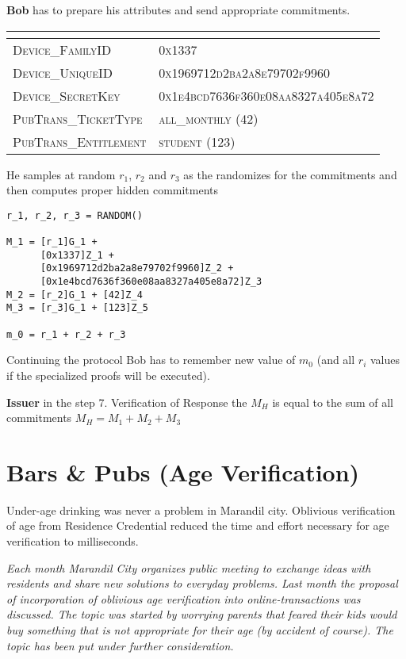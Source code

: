 \textbf{Bob} has to prepare his attributes and send appropriate commitments.
\begin{table}[H]
\centering
\renewcommand{\arraystretch}{1.3}
\begin{tabular}{>{\ttfamily\scshape}l >{\ttfamily\scshape}l}
\hline
\multicolumn{1}{c}{\textbf{UID}} & \multicolumn{1}{c}{\textbf{Value}} \\ \hline
Device\_FamilyID & 0x1337  \\
Device\_UniqueID & 0x1969712d2ba2a8e79702f9960  \\
Device\_SecretKey & 0x1e4bcd7636f360e08aa8327a405e8a72  \\
PubTrans\_TicketType & all\_monthly (42)  \\
PubTrans\_Entitlement & student (123) \\\hline
\end{tabular}
\end{table}

He samples at random $r_1$, $r_2$ and $r_3$ as the randomizes for the commitments and then computes proper \textsf{hidden} commitments

\small
\begin{verbatim}
r_1, r_2, r_3 = RANDOM()

M_1 = [r_1]G_1 + 
      [0x1337]Z_1 +
      [0x1969712d2ba2a8e79702f9960]Z_2 + 
      [0x1e4bcd7636f360e08aa8327a405e8a72]Z_3
M_2 = [r_2]G_1 + [42]Z_4
M_3 = [r_3]G_1 + [123]Z_5

m_0 = r_1 + r_2 + r_3
\end{verbatim}
\normalsize

Continuing the protocol Bob has to remember new value of $m_0$ (and all $r_i$ values if the specialized proofs will be executed).


\noindent\textbf{Issuer}  in the step 7. Verification of Response the $M_H$ is equal to the sum of all commitments $M_H = M_1 + M_2 + M_3$ 


\section{Bars \& Pubs (Age Verification)}

Under-age drinking was never a problem in Marandil city. Oblivious verification of age from Residence Credential reduced the time and effort necessary for age verification to milliseconds.

\emph{Each month Marandil City organizes public meeting to exchange ideas with residents and share new solutions to everyday problems. Last month the proposal of incorporation of oblivious age verification into online-transactions was discussed. The topic was started by worrying parents that feared their kids would buy something that is not appropriate for their age (by accident of course). The topic has been put under further consideration.}

